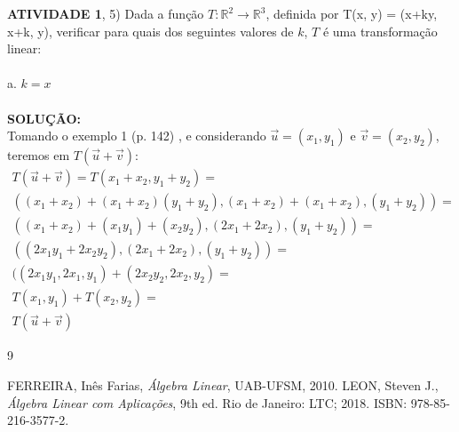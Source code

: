 \documentclass[a4paper,12pt]{article}
\begin{document}
\newpage
\onehalfspacing 
\noindent
\textbf{ATIVIDADE 1}, 5) Dada a função $T:\mathbb{R}^2 \rightarrow \mathbb{R}^3$, definida por T(x, y) = (x+ky, x+k, y), verificar para quais dos seguintes valores de $k$, $T$ é uma transformação linear: \\
\\
a. $k = x$ \\
\\
{\textbf{SOLUÇÃO:}} \\
Tomando o exemplo 1 (p. 142) \cite{ines}, e considerando $\vec{u}=(x_1,y_1)$ e $\vec{v}=(x_2,y_2)$, teremos em $T(\vec{u}+\vec{v})$:\\
\begin{equation}
    \begin{split}
        T(\vec{u}+\vec{v})=T(x_1+x_2, y_1+y_2)=\\
        ((x_1+x_2)+(x_1+x_2)(y_1+y_2),(x_1+x_2)+(x_1+x_2), (y_1+y_2))=\\
        ((x_1+x_2)+(x_1 y_1)+(x_2 y_2),(2x_1+2x_2),(y_1+y_2))=\\
        ((2x_1 y_1+2x_2 y_2), (2x_1 +2x_2), (y_1+y_2))=\\
        ((2x_1 y_1, 2x_1, y_1) + (2x_2 y_2, 2x_2, y_2)=\\
        T(x_1,y_1)+T(x_2,y_2)=\\
        T(\vec{u}+\vec{v})
    \end{split}
\end{equation}



\newpage
\noindent 

\begin{thebibliography}{9}

 FERREIRA, Inês Farias,
	\emph{Álgebra Linear}, UAB-UFSM, 2010.
 LEON, Steven J.,
	\emph{Álgebra Linear com Aplicações}, 9th ed. Rio de Janeiro: LTC; 2018. ISBN: 978-85-216-3577-2.

\end{thebibliography}
 
\end{document}
